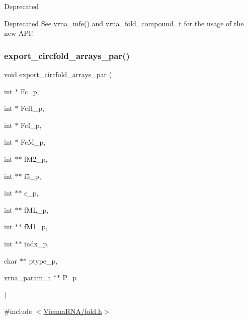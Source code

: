 \begin{DoxyRefDesc}{Deprecated}
\item[\hyperlink{deprecated__deprecated000076}{Deprecated}]See \hyperlink{group__mfe__fold_gabd3b147371ccf25c577f88bbbaf159fd}{vrna\+\_\+mfe()} and \hyperlink{group__fold__compound_ga1b0cef17fd40466cef5968eaeeff6166}{vrna\+\_\+fold\+\_\+compound\+\_\+t} for the usage of the new A\+P\+I!\end{DoxyRefDesc}
\mbox{\label{group__mfe__fold__single_ga004bb901e7fd2f8d5ae68f9530318ce1}} 
\subsubsection{\texorpdfstring{export\+\_\+circfold\+\_\+arrays\+\_\+par()}{export\_circfold\_arrays\_par()}}
{\footnotesize\ttfamily void export\+\_\+circfold\+\_\+arrays\+\_\+par (\begin{DoxyParamCaption}\item[{int $\ast$}]{Fc\+\_\+p,  }\item[{int $\ast$}]{Fc\+H\+\_\+p,  }\item[{int $\ast$}]{Fc\+I\+\_\+p,  }\item[{int $\ast$}]{Fc\+M\+\_\+p,  }\item[{int $\ast$$\ast$}]{f\+M2\+\_\+p,  }\item[{int $\ast$$\ast$}]{f5\+\_\+p,  }\item[{int $\ast$$\ast$}]{c\+\_\+p,  }\item[{int $\ast$$\ast$}]{f\+M\+L\+\_\+p,  }\item[{int $\ast$$\ast$}]{f\+M1\+\_\+p,  }\item[{int $\ast$$\ast$}]{indx\+\_\+p,  }\item[{char $\ast$$\ast$}]{ptype\+\_\+p,  }\item[{\hyperlink{group__energy__parameters_ga8a69ca7d787e4fd6079914f5343a1f35}{vrna\+\_\+param\+\_\+t} $\ast$$\ast$}]{P\+\_\+p }\end{DoxyParamCaption})}



{\ttfamily \#include $<$\hyperlink{fold_8h}{Vienna\+R\+N\+A/fold.\+h}$>$}

